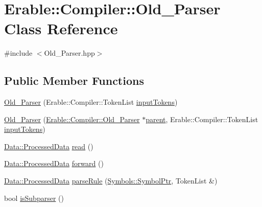 \hypertarget{class_erable_1_1_compiler_1_1_old___parser}{}\section{Erable\+::Compiler\+::Old\+\_\+\+Parser Class Reference}
\label{class_erable_1_1_compiler_1_1_old___parser}


{\ttfamily \#include $<$Old\+\_\+\+Parser.\+hpp$>$}

\subsection*{Public Member Functions}
\begin{DoxyCompactItemize}
\item 
\mbox{\hyperlink{class_erable_1_1_compiler_1_1_old___parser_a1ebc9556a66e666f2786b595ee3e7500}{Old\+\_\+\+Parser}} (Erable\+::\+Compiler\+::\+Token\+List \mbox{\hyperlink{class_erable_1_1_compiler_1_1_old___parser_ae6ba8138c01225a6f91445bd9a331b3d}{input\+Tokens}})
\item 
\mbox{\hyperlink{class_erable_1_1_compiler_1_1_old___parser_ad580c7534eb475d28c168c53b514dab9}{Old\+\_\+\+Parser}} (\mbox{\hyperlink{class_erable_1_1_compiler_1_1_old___parser}{Erable\+::\+Compiler\+::\+Old\+\_\+\+Parser}} $\ast$\mbox{\hyperlink{class_erable_1_1_compiler_1_1_old___parser_a8295ed96c8f71b828024e97fe0da88aa}{parent}}, Erable\+::\+Compiler\+::\+Token\+List \mbox{\hyperlink{class_erable_1_1_compiler_1_1_old___parser_ae6ba8138c01225a6f91445bd9a331b3d}{input\+Tokens}})
\item 
\mbox{\hyperlink{struct_erable_1_1_compiler_1_1_data_1_1_processed_data}{Data\+::\+Processed\+Data}} \mbox{\hyperlink{class_erable_1_1_compiler_1_1_old___parser_a591695085aaff057e5fbfcbb4ac1d72e}{read}} ()
\item 
\mbox{\hyperlink{struct_erable_1_1_compiler_1_1_data_1_1_processed_data}{Data\+::\+Processed\+Data}} \mbox{\hyperlink{class_erable_1_1_compiler_1_1_old___parser_aae8c00e9a6ec13d2f0895733c6d607f4}{forward}} ()
\item 
\mbox{\hyperlink{struct_erable_1_1_compiler_1_1_data_1_1_processed_data}{Data\+::\+Processed\+Data}} \mbox{\hyperlink{class_erable_1_1_compiler_1_1_old___parser_ab77eb298a60bd36d81c554703ada42aa}{parse\+Rule}} (\mbox{\hyperlink{namespace_erable_1_1_compiler_1_1_symbols_a8f0bc762f448ea4d84e8713ab3e140b9}{Symbols\+::\+Symbol\+Ptr}}, Token\+List \&)
\item 
bool \mbox{\hyperlink{class_erable_1_1_compiler_1_1_old___parser_a98a0ccf54ede094d2ed00d1e953eeaa5}{is\+Subparser}} ()
\end{DoxyCompactItemize}
